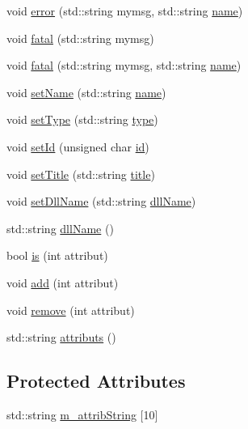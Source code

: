\begin{DoxyCompactItemize}
$$void \hyperlink{classObject_ad7f6c457733082efa2f9ff5f5c8e119a}{error} (std\+::string mymsg, std\+::string \hyperlink{classObject_a300f4c05dd468c7bb8b3c968868443c1}{name})
\item 
void \hyperlink{classObject_aad5a16aac7516ce65bd5ec02ab07fc80}{fatal} (std\+::string mymsg)
\item 
void \hyperlink{classObject_ae62acd3d09f716220f75f252dc38bc9a}{fatal} (std\+::string mymsg, std\+::string \hyperlink{classObject_a300f4c05dd468c7bb8b3c968868443c1}{name})
\item 
void \hyperlink{classObject_ae30fea75683c2d149b6b6d17c09ecd0c}{set\+Name} (std\+::string \hyperlink{classObject_a300f4c05dd468c7bb8b3c968868443c1}{name})
\item 
void \hyperlink{classObject_aae534cc9d982bcb9b99fd505f2e103a5}{set\+Type} (std\+::string \hyperlink{classObject_a84f99f70f144a83e1582d1d0f84e4e62}{type})
\item 
void \hyperlink{classObject_a398fe08cba594a0ce6891d59fe4f159f}{set\+Id} (unsigned char \hyperlink{classObject_af99145335cc61ff6e2798ea17db009d2}{id})
\item 
void \hyperlink{classObject_a89557dbbad5bcaa02652f5d7fa35d20f}{set\+Title} (std\+::string \hyperlink{classObject_a73a0f1a41828fdd8303dd662446fb6c3}{title})
\item 
void \hyperlink{classObject_a870c5af919958c2136623b2d7816d123}{set\+Dll\+Name} (std\+::string \hyperlink{classObject_a2e3947f2870094c332d7454117f3ec63}{dll\+Name})
\item 
std\+::string \hyperlink{classObject_a2e3947f2870094c332d7454117f3ec63}{dll\+Name} ()
\item 
bool \hyperlink{classAttrib_a704f26af560909ad22065083bb7d4c34}{is} (int attribut)
\item 
void \hyperlink{classAttrib_a235f773af19c900264a190b00a3b4ad7}{add} (int attribut)
\item 
void \hyperlink{classAttrib_a7d4ef7e32d93cb287792b87b857e79f3}{remove} (int attribut)
\item 
std\+::string \hyperlink{classAttrib_aee7bbf16b144887f196e1341b24f8a26}{attributs} ()
\end{DoxyCompactItemize}
\subsection*{Protected Attributes}
\begin{DoxyCompactItemize}
\item 
std\+::string \hyperlink{classAttrib_a3414521d7a82476e874b25a5407b5e63}{m\+\_\+attrib\+String} \mbox{[}10\mbox{]}
\end{DoxyCompactItemize}
